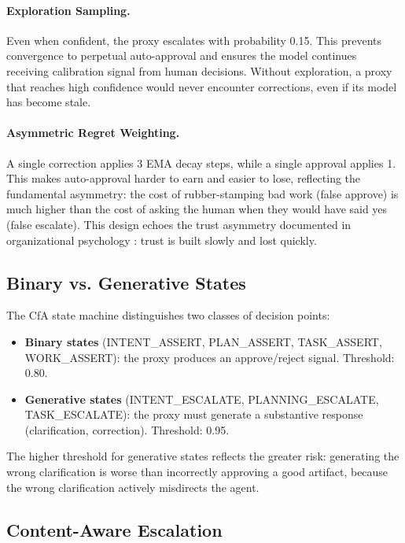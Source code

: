 \documentclass[11pt,a4paper]{article}
\begin{document}
\paragraph{Exploration Sampling.}
Even when confident, the proxy escalates with probability 0.15. This
prevents convergence to perpetual auto-approval and ensures the model
continues receiving calibration signal from human decisions. Without
exploration, a proxy that reaches high confidence would never encounter
corrections, even if its model has become stale.

\paragraph{Asymmetric Regret Weighting.}
A single correction applies 3 EMA decay steps, while a single approval
applies 1. This makes auto-approval harder to earn and easier to lose,
reflecting the fundamental asymmetry: the cost of rubber-stamping bad
work (false approve) is much higher than the cost of asking the human
when they would have said yes (false escalate). This design echoes
the trust asymmetry documented in organizational psychology
\citep{edmondson1999psychological}: trust is built slowly and lost quickly.

\subsection{Binary vs. Generative States}

The CfA state machine distinguishes two classes of decision points:

\begin{itemize}
    \item \textbf{Binary states} (INTENT\_ASSERT, PLAN\_ASSERT,
    TASK\_ASSERT, WORK\_ASSERT): the proxy produces an approve/reject
    signal. Threshold: 0.80.
    \item \textbf{Generative states} (INTENT\_ESCALATE,
    PLANNING\_ESCALATE, TASK\_ESCALATE): the proxy must generate a
    substantive response (clarification, correction). Threshold: 0.95.
\end{itemize}

The higher threshold for generative states reflects the greater risk:
generating the wrong clarification is worse than incorrectly approving
a good artifact, because the wrong clarification actively misdirects
the agent.

\subsection{Content-Aware Escalation}
\end{document}
